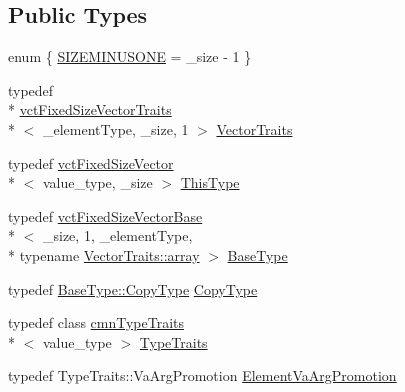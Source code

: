 \subsection*{Public Types}
\begin{DoxyCompactItemize}
\item 
enum \{ \hyperlink{classvct_fixed_size_vector_ae684c096a8e0682238147d0cbc182cdeaa60fa332debc82a5c232c3330c14f4fd}{S\-I\-Z\-E\-M\-I\-N\-U\-S\-O\-N\-E} = \-\_\-size -\/ 1
 \}
\item 
typedef \\*
\hyperlink{classvct_fixed_size_vector_traits}{vct\-Fixed\-Size\-Vector\-Traits}\\*
$<$ \-\_\-element\-Type, \-\_\-size, 1 $>$ \hyperlink{classvct_fixed_size_vector_a82ab46671bc55178f97dd3245aed0600}{Vector\-Traits}
\item 
typedef \hyperlink{classvct_fixed_size_vector}{vct\-Fixed\-Size\-Vector}\\*
$<$ value\-\_\-type, \-\_\-size $>$ \hyperlink{classvct_fixed_size_vector_ab843a1db4f68a04960de8f4fea28adda}{This\-Type}
\item 
typedef \hyperlink{classvct_fixed_size_vector_base}{vct\-Fixed\-Size\-Vector\-Base}\\*
$<$ \-\_\-size, 1, \-\_\-element\-Type, \\*
typename \hyperlink{classvct_fixed_size_vector_traits_ab86355023bee9fbca9ee14640c6b7f4e}{Vector\-Traits\-::array} $>$ \hyperlink{classvct_fixed_size_vector_a04088d3a17a06af2d59f3bd99c42fb75}{Base\-Type}
\item 
typedef \hyperlink{classvct_fixed_size_vector_base_a136da6f4bb90964f3f156533f85416d9}{Base\-Type\-::\-Copy\-Type} \hyperlink{classvct_fixed_size_vector_afcfc466ed71975aef98c2789fd3e4dcf}{Copy\-Type}
\item 
typedef class \hyperlink{classcmn_type_traits}{cmn\-Type\-Traits}\\*
$<$ value\-\_\-type $>$ \hyperlink{classvct_fixed_size_vector_a31021c195f3f1ccf57f4bede713bd629}{Type\-Traits}
\item 
typedef Type\-Traits\-::\-Va\-Arg\-Promotion \hyperlink{classvct_fixed_size_vector_a1adb96488f833cc25746022bdb2faf80}{Element\-Va\-Arg\-Promotion}
\end{DoxyCompactItemize}
